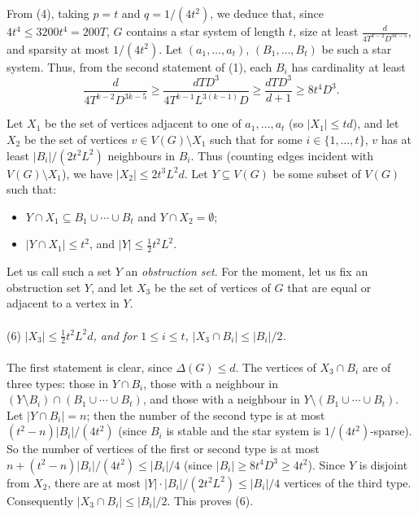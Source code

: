 \documentclass[titlepage,11pt]{article}
\def\LL{,\ldots,}
\newcommand{\cupcup}{\cup \cdots\cup}
\begin{document}
\bigskip

From (4), taking $p=t$ and $q=1/(4t^2)$, we deduce that, since $4t^4\le 3200t^4=200T$, $G$ contains a star system of length $t$, 
size at least $\frac{d}{4T^{k-2}D^{3k-5}}$, and sparsity at most $1/(4t^2)$. Let $(a_1\LL a_t)$,
$(B_1\LL B_t)$ be such a star system. Thus, from the second statement of (1), each $B_i$ has cardinality at least 
$$\frac{d}{4T^{k-2}D^{3k-5}}\ge \frac{dTD^3}{4T^{k-1}L^{3(k-1)}D}\ge \frac{dTD^3}{d+1}\ge 8t^4D^3.$$


Let $X_1$ be the set of vertices adjacent to one of $a_1\LL a_t$ (so $|X_1|\le td$), and let 
$X_2$ be the set of vertices $v\in V(G)\setminus X_1$ such that for some $i\in \{1\LL t\}$, $v$ has 
at least $|B_i|/(2t^2L^2)$ neighbours in $B_i$. Thus (counting edges incident with $V(G)\setminus X_1$), we have $|X_2|\le 2t^3L^2d$. 
Let $Y\subseteq V(G)$ be some subset of $V(G)$
such that:
\begin{itemize}
\item $Y\cap X_1\subseteq B_1\cupcup B_t$ and $Y\cap X_2=\emptyset$;
\item $|Y\cap X_1|\le t^2$, and $|Y|\le \frac12 t^2L^2$.
\end{itemize}
Let us call such a set $Y$ an {\em obstruction set}.
For the moment, let us fix an obstruction set $Y$, and let $X_3$ be the set of vertices of $G$ that are equal or adjacent to a vertex in $Y$. 
\\
\\
(6) {\em $|X_3|\le \frac12 t^2L^2d$, and for $1\le i\le t$, $|X_3\cap B_i|\le |B_i|/2$.}
\\
\\
The first statement is clear, since $\Delta(G)\le d$. The vertices of $X_3\cap B_i$ are of three types: those in $Y\cap B_i$, those
with a neighbour in $(Y\setminus B_i)\cap (B_1\cupcup B_t)$, and those with a neighbour in $Y\setminus (B_1\cupcup B_t)$.
Let $|Y\cap B_i|=n$; then the number of the second type is at most $(t^2-n)|B_i|/(4t^2)$ (since $B_i$ is stable and 
the star system is $1/(4t^2)$-sparse). So the number of vertices of the first or second type is at most 
$n+(t^2-n)|B_i|/(4t^2)\le |B_i|/4$ (since $|B_i|\ge 8t^4D^3\ge 4t^2$).
Since $Y$ is disjoint from $X_2$, there are at most $|Y|\cdot |B_i|/(2t^2L^2)\le |B_i|/4$
vertices of the third type. Consequently $|X_3\cap B_i|\le |B_i|/2$. This proves (6).

\bigskip
\end{document}
